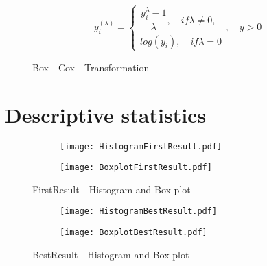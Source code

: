 \begin{figure}[htbp]
\caption{Box - Cox - Transformation}
\label{BoxCoxTransformation}
\begin{equation}
y_i^{(\lambda)} = \begin{cases}
\dfrac{y_i^{\lambda}-1}{\lambda}, \quad if \lambda \neq 0, \\ 
log(y_i), \quad if \lambda = 0
\end{cases}, \quad y > 0 
\end{equation}

\end{figure}

\section{Descriptive statistics}
		\label{Appendix-Descriptive}
		
\begin{figure}[htbp] %
\begin{center} 
\begin{subfigure} 
\centering
\texttt{[image: HistogramFirstResult.pdf]}
\end{subfigure} 
\begin{subfigure} 
\centering
  \texttt{[image: BoxplotFirstResult.pdf]}
\end{subfigure}
  \caption{FirstResult - Histogram and Box plot}
    \label{DistributionFirstResult} 
\end{center}
\end{figure}

\begin{figure}[htbp] %
\begin{center} 
\begin{subfigure} 
\centering
\texttt{[image: HistogramBestResult.pdf]}
\end{subfigure} 
\begin{subfigure} 
\centering
  \texttt{[image: BoxplotBestResult.pdf]}
\end{subfigure}
  \caption{BestResult - Histogram and Box plot}
    \label{DistributionBestResult} 
\end{center}
\end{figure}

